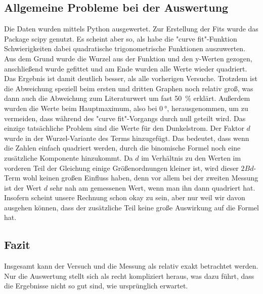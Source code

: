 \subsection{Allgemeine Probleme bei der Auswertung}
Die Daten wurden mittels Python ausgewertet. Zur Erstellung der Fits wurde das Package scipy \cite{scipy} genutzt. Es scheint aber so, als habe die "curve fit"-Funktion Schwierigkeiten dabei quadratische trigonometrische Funktionen auszuwerten. Aus dem Grund wurde die Wurzel aus der Funktion und den y-Werten gezogen, anschließend wurde gefittet und am Ende wurden alle Werte wieder quadriert. Das Ergebnis ist damit deutlich besser, als alle vorherigen Versuche. Trotzdem ist die Abweichung speziell beim ersten und dritten Graphen noch relativ groß, was dann auch die Abweichung zum Literaturwert um fast \SI{50}{\percent} erklärt. 
Außerdem wurden die Werte beim Hauptmaximum, also bei $\SI{0}{\degree}$, herausgenommen, um zu vermeiden, dass während des "curve fit"-Vorgangs durch null geteilt wird. 
Das einzige tatsächliche Problem sind die Werte für den Dunkelstrom. Der Faktor $d$ wurde in der Wurzel-Variante des Terms hinzugefügt. Das bedeutet, dass wenn die Zahlen einfach quadriert werden, durch die binomische Formel noch eine zusätzliche Komponente hinzukommt. Da $d$ im Verhältnis zu den Werten im vorderen Teil der Gleichung einige Größenordnungen kleiner ist, wird dieser $2 B d$-Term wohl keinen großen Einfluss haben, denn vor allem bei der zweiten Messung ist der Wert $d$ sehr nah am gemessenen Wert, wenn man ihn dann quadriert hat. Insofern scheint unsere Rechnung schon okay zu sein, aber nur weil wir davon ausgehen können, dass der zusätzliche Teil keine große Auswirkung auf die Formel hat. 

\subsection{Fazit} 
Insgesamt kann der Versuch und die Messung als relativ exakt betrachtet werden. Nur die Auswertung stellt sich als recht kompliziert heraus, was dazu führt, dass die Ergebnisse nicht so gut sind, wie ursprünglich erwartet.  

\newpage

